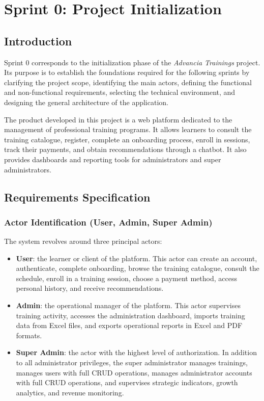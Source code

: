 \chapter{Sprint 0: Project Initialization}

\section*{Introduction}
Sprint 0 corresponds to the initialization phase of the \textit{Advancia Trainings} project. Its purpose is to establish the foundations required for the following sprints by clarifying the project scope, identifying the main actors, defining the functional and non-functional requirements, selecting the technical environment, and designing the general architecture of the application.

The product developed in this project is a web platform dedicated to the management of professional training programs. It allows learners to consult the training catalogue, register, complete an onboarding process, enroll in sessions, track their payments, and obtain recommendations through a chatbot. It also provides dashboards and reporting tools for administrators and super administrators.

\section{Requirements Specification}
\subsection{Actor Identification (User, Admin, Super Admin)}
The system revolves around three principal actors:

\begin{itemize}
\item \textbf{User}: the learner or client of the platform. This actor can create an account, authenticate, complete onboarding, browse the training catalogue, consult the schedule, enroll in a training session, choose a payment method, access personal history, and receive recommendations.
\item \textbf{Admin}: the operational manager of the platform. This actor supervises training activity, accesses the administration dashboard, imports training data from Excel files, and exports operational reports in Excel and PDF formats.
\item \textbf{Super Admin}: the actor with the highest level of authorization. In addition to all administrator privileges, the super administrator manages trainings, manages users with full CRUD operations, manages administrator accounts with full CRUD operations, and supervises strategic indicators, growth analytics, and revenue monitoring.
\end{itemize}

